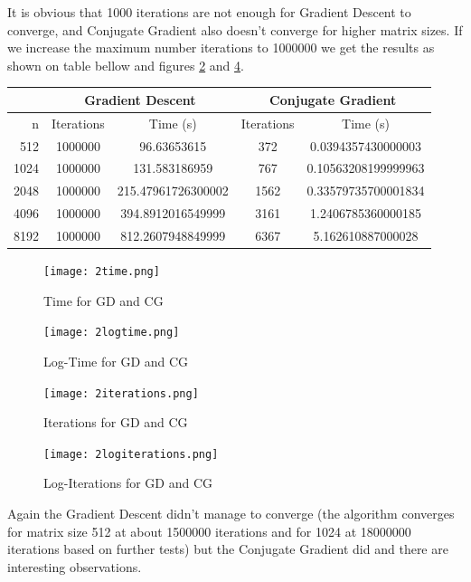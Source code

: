 \documentclass[a4paper]{article}
\begin{document}
It is obvious that 1000 iterations are not enough for Gradient Descent to converge, and Conjugate Gradient also doesn't converge for higher matrix sizes. If we increase the maximum number iterations to 1000000 we get the results as shown on table bellow and figures \ref{fig:logtimegdcg} and \ref{fig:logitgdcg}.

\begin{center}
	\begin{tabular}{r | c | c | c | c }
		& \multicolumn{2}{c}{Gradient Descent} & \multicolumn{2}{c}{Conjugate Gradient}\\ \hline
		n & Iterations & Time (s) & Iterations & Time (s)\\ \hline
		512 & 1000000 & 96.63653615 & 372 & 0.0394357430000003\\ \hline
		1024 & 1000000 & 131.583186959 & 767 & 0.10563208199999963\\ \hline
		2048 & 1000000 & 215.47961726300002 & 1562 & 0.33579735700001834\\ \hline
		4096 & 1000000 & 394.8912016549999 & 3161 & 1.2406785360000185\\ \hline
		8192 & 1000000 & 812.2607948849999 & 6367 & 5.162610887000028\\ \hline
	\end{tabular} 
\end{center}

\begin{figure}[H]
	\centering
	\texttt{[image: 2time.png]}
	\caption{Time for GD and CG}
	\label{fig:timegdcg}
\end{figure}

\begin{figure}[H]
	\centering
	\texttt{[image: 2logtime.png]}
	\caption{Log-Time for GD and CG}
	\label{fig:logtimegdcg}
\end{figure}

\begin{figure}[H]
	\centering
	\texttt{[image: 2iterations.png]}
	\caption{Iterations for GD and CG}
	\label{fig:itgdcg}
\end{figure}

\begin{figure}[H]
	\centering
	\texttt{[image: 2logiterations.png]}
	\caption{Log-Iterations for GD and CG}
	\label{fig:logitgdcg}
\end{figure}

Again the Gradient Descent didn't manage to converge (the algorithm converges for matrix size 512 at about 1500000 iterations and for 1024 at 18000000 iterations based on further tests) but the Conjugate Gradient did and there are interesting observations.
\end{document}
